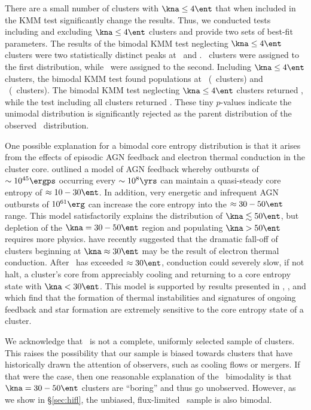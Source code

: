 \documentclass{emulateapj}
\begin{document}
There are a small number of clusters with $\kna \le 4 \ent$ that when
included in the KMM test significantly change the results. Thus, we
conducted tests including and excluding $\kna \le 4 \ent$ clusters and
provide two sets of best-fit parameters. The results of the bimodal
KMM test neglecting $\kna \le 4 \ent$ clusters were two statistically
distinct peaks at \kmma\ and \kmmb. \kmmc\ clusters were assigned to
the first distribution, while \kmmd\ were assigned to the
second. Including $\kna \le 4 \ent$ clusters, the bimodal KMM test
found populations at \kmmf\ (\kmmh\ clusters) and
\kmmg\ (\kmmi\ clusters). The bimodal KMM test neglecting $\kna \le 4
\ent$ clusters returned \kmme, while the test including all clusters
returned \kmmj. These tiny $p$-values indicate the unimodal
distribution is significantly rejected as the parent distribution of
the observed \kna\ distribution.

One possible explanation for a bimodal core entropy distribution is
that it arises from the effects of episodic AGN feedback and electron
thermal conduction in the cluster core. \citet{agnframework} outlined
a model of AGN feedback whereby outbursts of $\sim 10^{45} \ergps$
occurring every $\sim 10^8 \yrs$ can maintain a quasi-steady core
entropy of $\approx 10-30 \ent$. In addition, very energetic and
infrequent AGN outbursts of $10^{61} \erg$ can increase the core
entropy into the $\approx 30-50 \ent$ range. This model satisfactorily
explains the distribution of $\kna \lesssim 50 \ent$, but depletion of
the $\kna = 30-50 \ent$ region and populating $\kna > 50 \ent$
requires more physics. \citet{conduction} have recently suggested that
the dramatic fall-off of clusters beginning at $\kna \approx 30 \ent$
may be the result of electron thermal conduction. After \kna\ has
exceeded $\approx 30 \ent$, conduction could severely slow, if not
halt, a cluster's core from appreciably cooling and returning to a
core entropy state with $\kna < 30 \ent$. This model is supported by
results presented in \citet{haradent}, \citet{2008arXiv0804.3823G},
and \citet{2008arXiv0802.1864R} which find that the formation of
thermal instabilities and signatures of ongoing feedback and star
formation are extremely sensitive to the core entropy state of a
cluster.

We acknowledge that \accept\ is not a complete, uniformly selected
sample of clusters. This raises the possibility that our sample is
biased towards clusters that have historically drawn the attention of
observers, such as cooling flows or mergers. If that were the case,
then one reasonable explanation of the \kna\ bimodality is that $\kna
= 30-50 \ent$ clusters are ``boring'' and thus go unobserved. However,
as we show in \S\ref{sec:hifl}, the unbiased, flux-limited
\hifl\ sample is also bimodal.
\end{document}
